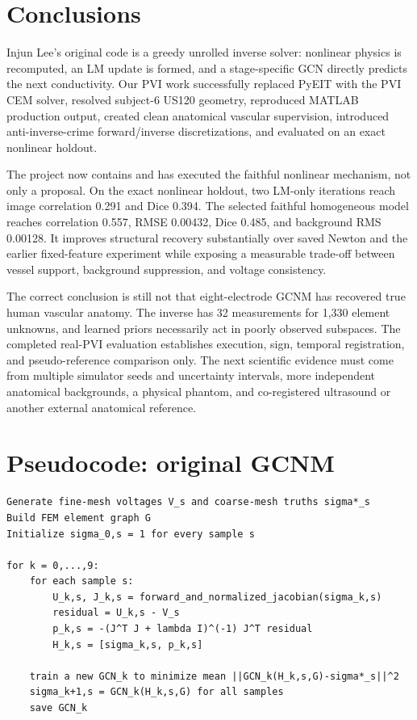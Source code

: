 \documentclass[11pt]{article}
\begin{document}
\section{Conclusions}

Injun Lee's original code is a greedy unrolled inverse solver: nonlinear physics is
recomputed, an LM update is formed, and a stage-specific GCN directly predicts the
next conductivity.  Our PVI work successfully replaced PyEIT with the PVI CEM
solver, resolved subject-6 US120 geometry, reproduced MATLAB production output,
created clean anatomical vascular supervision, introduced anti-inverse-crime
forward/inverse discretizations, and evaluated on an exact nonlinear holdout.

The project now contains and has executed the faithful nonlinear mechanism, not
only a proposal.  On the exact nonlinear holdout, two LM-only iterations reach
image correlation 0.291 and Dice 0.394.  The selected faithful homogeneous model
reaches correlation 0.557, RMSE 0.00432, Dice 0.485, and background RMS 0.00128.
It improves structural recovery substantially over saved Newton and the earlier
fixed-feature experiment while exposing a measurable trade-off between vessel
support, background suppression, and voltage consistency.

The correct conclusion is still not that eight-electrode GCNM has recovered true
human vascular anatomy.  The inverse has 32 measurements for 1,330 element unknowns,
and learned priors necessarily act in poorly observed subspaces.  The completed
real-PVI evaluation establishes execution, sign, temporal registration, and
pseudo-reference comparison only.  The next scientific evidence must come from
multiple simulator seeds and uncertainty intervals, more independent anatomical
backgrounds, a physical phantom, and co-registered ultrasound or another external
anatomical reference.

\appendix

\section{Pseudocode: original GCNM}

\begin{lstlisting}
Generate fine-mesh voltages V_s and coarse-mesh truths sigma*_s
Build FEM element graph G
Initialize sigma_0,s = 1 for every sample s

for k = 0,...,9:
    for each sample s:
        U_k,s, J_k,s = forward_and_normalized_jacobian(sigma_k,s)
        residual = U_k,s - V_s
        p_k,s = -(J^T J + lambda I)^(-1) J^T residual
        H_k,s = [sigma_k,s, p_k,s]

    train a new GCN_k to minimize mean ||GCN_k(H_k,s,G)-sigma*_s||^2
    sigma_k+1,s = GCN_k(H_k,s,G) for all samples
    save GCN_k
\end{lstlisting}
\end{document}
